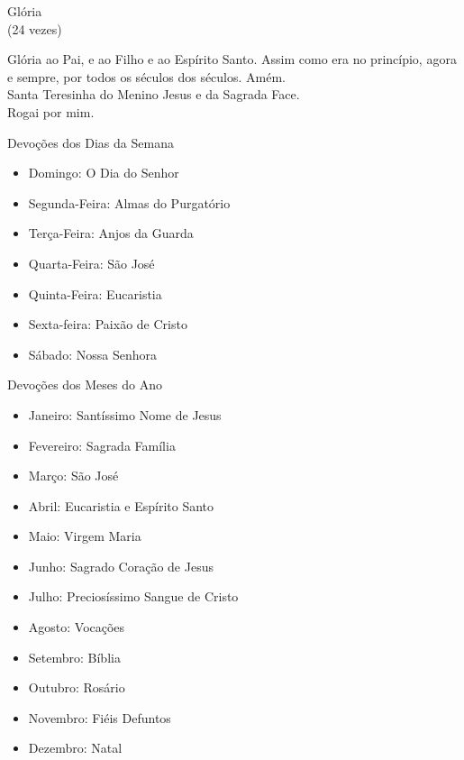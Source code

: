 \begin{center}
    Glória \\ \textcolor{VioletRed3}{\scriptsize{(24 vezes)}}
\end{center}
\begin{flushleft}
    Glória ao Pai, e ao Filho e ao Espírito Santo. Assim como era no princípio, agora e sempre, por todos os séculos dos séculos. Amém.
    \vspace{.2cm} \\
    \VbarRed{} Santa Teresinha do Menino Jesus e da Sagrada Face. \\
    \RbarRed{} Rogai por mim.
\end{flushleft}
\newpage
\begin{center}
    Devoções dos Dias da Semana
\end{center}
\begin{itemize}
    \item Domingo: O Dia do Senhor
    \item Segunda-Feira: Almas do Purgatório
    \item Terça-Feira: Anjos da Guarda
    \item Quarta-Feira: São José
    \item Quinta-Feira: Eucaristia
    \item Sexta-feira: Paixão de Cristo
    \item Sábado: Nossa Senhora
\end{itemize}
\begin{center}
    Devoções dos Meses do Ano
\end{center}
\begin{itemize}
    \item Janeiro: Santíssimo Nome de Jesus
    \item Fevereiro: Sagrada Família
    \item Março: São José
    \item Abril: Eucaristia e Espírito Santo
    \item Maio: Virgem Maria
    \item Junho: Sagrado Coração de Jesus
    \item Julho: Preciosíssimo Sangue de Cristo
    \item Agosto: Vocações
    \item Setembro: Bíblia
    \item Outubro: Rosário
    \item Novembro: Fiéis Defuntos
    \item Dezembro: Natal
\end{itemize}

